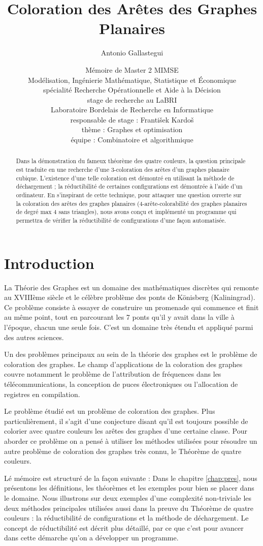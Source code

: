 \documentclass[10pt,a4paper]{article}
\title{Coloration des Arêtes des Graphes Planaires}
\author{Antonio Gallastegui
 }
\date{
 Mémoire de Master 2 MIMSE \\
  Modélisation, Ingénierie Mathématique, Statistique et Économique \\
  spécialité Recherche Opérationnelle et Aide à la Décision \\\bigskip
  stage de recherche au LaBRI\\
  Laboratoire Bordelais de Recherche en Informatique \\
  responsable de stage : Franti\v sek Kardo\v s  \\
  thème : Graphes et optimisation \\
  équipe : Combinatoire et algorithmique  \\
 }
\begin{document}
\thispagestyle{empty}
\maketitle

\begin{abstract}
Dans la démonstration du fameux théorème des quatre couleurs, la question principale est traduite en une recherche d'une 3-coloration des arêtes d'un graphes planaire cubique. L'existence d'une telle coloration est démontré en utilisant la méthode de déchargement ; la réductibilité de certaines configurations est démontrée à l'aide d'un ordinateur. En s'inspirant de cette technique, pour attaquer une question ouverte sur la coloration des arêtes des graphes planaires (4-arête-colorabilité des graphes planaires de degré max 4 sans triangles), nous avons conçu et implémenté un programme qui permettra de vérifier la réductibilité de configurations d'une façon automatisée. 
\end{abstract}

\section*{Introduction}
La Théorie des Graphes est un domaine des mathématiques discrètes qui remonte au XVIIIème siècle et le célèbre problème des ponts de Könisberg (Kaliningrad). Ce problème consiste à essayer de construire un promenade qui commence et finit au même point, tout en parcourant les 7 ponts qu'il y avait dans la ville à l'époque, chacun une seule fois. C'est un domaine très étendu et appliqué parmi des autres sciences. 

Un des problèmes principaux au sein de la théorie des graphes est le problème de coloration des graphes. Le champ d'applications de la coloration des graphes couvre notamment le problème de l'attribution de fréquences dans les télécommunications, la conception de puces électroniques ou l'allocation de registres en compilation.

Le problème étudié est un problème de coloration des graphes. Plus particulièrement, il s'agit d'une conjecture disant qu'il est toujours possible  de colorier avec quatre couleurs les arêtes des graphes d'une certaine classe. Pour aborder ce problème on a pensé à utiliser les méthodes utilisées pour résoudre un autre problème de coloration des graphes très connu, le Théorème de quatre couleurs. 

Lé mémoire est structuré de la façon suivante :
Dans le chapitre \ref{chap:pres}, nous présentons les définitions, les théorèmes et les exemples pour bien se placer dans le domaine. Nous illustrons sur deux exemples d'une complexité non-triviale les deux méthodes principales utilisées aussi dans la preuve du Théorème de quatre couleurs : la réductibilité de configurations et la méthode de déchargement. Le concept de réductibilité est décrit plus détaillé, par ce que c'est pour avancer dans cette démarche qu'on a développer un programme.
\end{document}
